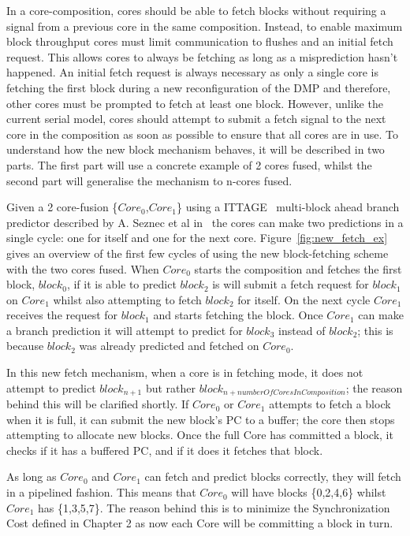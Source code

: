 In a core-composition, cores should be able to fetch blocks without requiring a signal from a previous core in the same composition.
Instead, to enable maximum block throughput cores must limit communication to flushes and an initial fetch request.
This allows cores to always be fetching as long as a misprediction hasn't happened.
An initial fetch request is always necessary as only a single core is fetching the first block during a new reconfiguration of the DMP and therefore, other cores must be prompted to fetch at least one block.
However, unlike the current serial model, cores should attempt to submit a fetch signal to the next core in the composition as soon as possible to ensure that all cores are in use.
To understand how the new block mechanism behaves, it will be described in two parts.
The first part will use a concrete example of 2 cores fused, whilst the second part will generalise the mechanism to n-cores fused.

Given a 2 core-fusion \{$Core_0$,$Core_1$\} using a ITTAGE~\cite{SeznecITTAGE} multi-block ahead branch predictor described by A. Seznec et al in~\cite{SeseznecMultipleBlock} the cores can make two predictions in a single cycle: one for itself and one for the next core.
Figure~\ref{fig:new_fetch_ex} gives an overview of the first few cycles of using the new block-fetching scheme with the two cores fused.
When $Core_0$ starts the composition and fetches the first block, $block_0$, if it is able to predict $block_2$ is will submit a fetch request for $block_1$ on $Core_1$ whilst also attempting to fetch $block_2$ for itself.
On the next cycle $Core_1$ receives the request for $block_1$ and starts fetching the block.
Once $Core_1$ can make a branch prediction it will attempt to predict for $block_3$ instead of $block_2$; this is because $block_2$ was already predicted and fetched on $Core_0$.

In this new fetch mechanism, when a core is in fetching mode, it does not attempt to predict $block_{n+1}$ but rather $block_{n+numberOfCoresInComposition}$; the reason behind this will be clarified shortly.
If $Core_0$ or $Core_1$ attempts to fetch a block when it is full, it can submit the new block's PC to a buffer; the core then stops attempting to allocate new blocks.
Once the full Core has committed a block, it checks if it has a buffered PC, and if it does it fetches that block.

As long as $Core_0$ and $Core_1$ can fetch and predict blocks correctly, they will fetch in a pipelined fashion.
This means that $Core_0$ will have blocks \{0,2,4,6\} whilst $Core_1$ has \{1,3,5,7\}.
The reason behind this is to minimize the Synchronization Cost defined in Chapter 2 as now each Core will be committing a block in turn.


